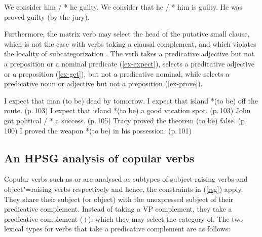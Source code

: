 \documentclass[output=paper
	        ,collection
	        ,collectionchapter
 	        ,biblatex
                ,babelshorthands
                ,newtxmath
                ,draftmode
                ,colorlinks, citecolor=brown
]{langscibook}
\begin{document}
\eal
\ex We consider him / * he guilty.
\ex We consider that he / * him is guilty.
\ex He was proved guilty (by the jury).	
\zl
	

Furthermore, the matrix verb may select the head of the putative small clause, which is not the case
with verbs taking a clausal complement, and which violates the 
locality of subcategorization \citep[]{PollardandSag1994}. The
verb  takes a predicative adjective but not a preposition or a nominal predicate (\ref{ex-expect}),
 selects a predicative adjective or a preposition (\ref{ex-get}), but not a predicative nominal, while
 selects a predicative noun or adjective but not a preposition (\ref{ex-prove}).


\eal
\label{ex-expect}
\ex I expect that man (to be) dead  by tomorrow. \citep[]{PollardandSag1994}
\ex I expect that island *(to be) off the route. (p.\,103)
\ex I expect that island *(to be) a good vacation spot. (p.\,103)
\zl
\ea
\label{ex-get}
John got political / * a success. (p.\,105)	
\z
\eal
\label{ex-prove}
\ex Tracy proved the theorem (to be) false. (p.\,100)
\ex I proved the weapon *(to be) in his possession.	(p.\,101)
\zl
	


\subsection{An HPSG analysis of copular verbs}
\label{control-sec-copula-verbs}
	
Copular verbs such as  or  are analysed as subtypes of subject-raising verbs
and object"=raising verbs respectively and hence, the constraints in (\ref{rsg}) apply. They share their subject (or object) with the
unexpressed subject of their predicative complement. Instead of taking a VP complement, they take a
predicative complement (\prd $+$), which they may select the category of.  The two lexical types for
verbs that take a predicative complement are as follows:

\eal
\label{ex-subj-pred-v}
\ex {} \impl\\
\ex {} \impl\\ 
\zl
\end{document}
